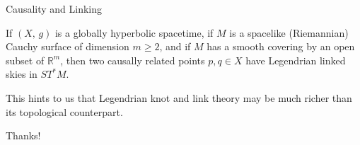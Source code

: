 \documentclass{beamer}
\begin{document}
    \begin{frame}{Causality and Linking}
        \begin{theorem}
            If $(X,\,g)$ is a globally hyperbolic spacetime, if $M$ is a
            spacelike (Riemannian) Cauchy surface of dimension $m\geq{2}$, and
            if $M$ has a smooth covering by an open subset of $\mathbb{R}^{m}$,
            then two causally related points $p,q\in{X}$ have Legendrian linked
            skies in $ST^{*}M$.
        \end{theorem}
        This hints to us that Legendrian knot and link theory may be much
        richer than its topological counterpart.
    \end{frame}
    \begin{frame}
        \centering
        Thanks!
    \end{frame}
\end{document}
